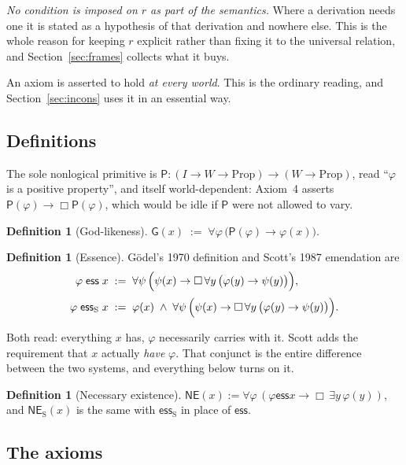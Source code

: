 \documentclass[11pt]{article}
\theoremstyle{plain}
\theoremstyle{definition}
\newtheorem{definition}[theorem]{Definition}
\newcommand{\Prp}{\mathrm{Prop}}
\newcommand{\ess}{\mathrel{\mathsf{ess}}}
\newcommand{\esss}{\mathrel{\mathsf{ess}_{\mathrm{S}}}}
\newcommand{\NE}{\mathsf{NE}}
\newcommand{\NES}{\mathsf{NE}_{\mathrm{S}}}
\newcommand{\Gd}{\mathsf{G}}
\newcommand{\Pos}{\mathsf{P}}
\begin{document}
\emph{No condition is imposed on $r$ as part of the semantics.} Where a
derivation needs one it is stated as a hypothesis of that derivation and
nowhere else. This is the whole reason for keeping $r$ explicit rather than
fixing it to the universal relation, and Section~\ref{sec:frames} collects what
it buys.

An axiom is asserted to hold \emph{at every world}. This is the ordinary
reading, and Section~\ref{sec:incons} uses it in an essential way.

\subsection{Definitions}

The sole nonlogical primitive is
$\Pos : (I \to W \to \Prp) \to (W \to \Prp)$, read ``$\varphi$ is a positive
property'', and itself world-dependent: Axiom~4 asserts
$\Pos(\varphi) \to \Box \Pos(\varphi)$, which would be idle if $\Pos$ were not
allowed to vary.

\begin{definition}[God-likeness]
$\Gd(x) \;:=\; \forall \varphi\,\bigl(\Pos(\varphi) \to \varphi(x)\bigr)$.
\end{definition}

\begin{definition}[Essence]\label{def:ess}
G\"odel's 1970 definition and Scott's 1987 emendation are
\begin{align*}
  \varphi \ess x  &\;:=\;
    \forall \psi\,\Bigl(\psi(x) \to \Box\,\forall y\,\bigl(\varphi(y) \to \psi(y)\bigr)\Bigr), \\[2pt]
  \varphi \esss x &\;:=\;
    \varphi(x) \;\wedge\;
    \forall \psi\,\Bigl(\psi(x) \to \Box\,\forall y\,\bigl(\varphi(y) \to \psi(y)\bigr)\Bigr).
\end{align*}
\end{definition}

\noindent
Both read: everything $x$ has, $\varphi$ necessarily carries with it. Scott
adds the requirement that $x$ actually \emph{have} $\varphi$. That conjunct is
the entire difference between the two systems, and everything below turns on
it.

\begin{definition}[Necessary existence]
$\NE(x) := \forall \varphi\,(\varphi \ess x \to \Box\,\exists y\,\varphi(y))$,
and $\NES(x)$ is the same with $\esss$ in place of $\ess$.
\end{definition}

\subsection{The axioms}
\end{document}
